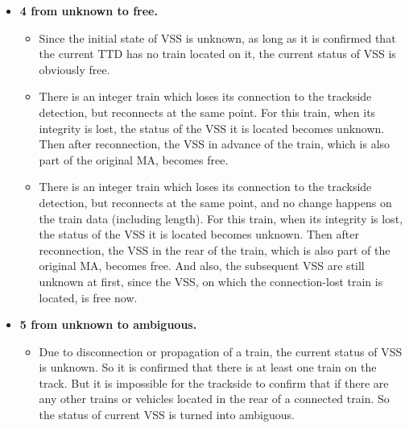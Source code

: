 \documentclass[article,dr=phil,type=drfinal,colorback,accentcolor=tud9c]{tudthesis}
\begin{document}
\begin{itemize}
\begin{itemize}
    \end{itemize}  		
  	
  	\item \textbf{4 from unknown to free.}
  	
  	\begin{itemize}
	
	\item 
	
	Since the initial state of VSS is unknown, as long as it is confirmed that the current TTD has no train located on it, the current status of VSS is obviously free.
	
	\item 
	
	There is an integer train which loses its connection to the trackside detection, but reconnects at the same point. For this train, when its integrity is lost, the status of the VSS it is located becomes unknown. Then after reconnection, the VSS in advance of the train, which is also part of the original MA, becomes free.
	
	\item 
	
	There is an integer train which loses its connection to the trackside detection, but reconnects at the same point, and no change happens on the train data (including length). For this train, when its integrity is lost, the status of the VSS it is located becomes unknown. Then after reconnection, the VSS in the rear of the train, which is also part of the original MA, becomes free. And also, the subsequent VSS are still unknown at first, since the VSS, on which the connection-lost train is located, is free now.
	
    \end{itemize}  	
  	
  	\item \textbf{5 from unknown to ambiguous.}

  	\begin{itemize}
	
	\item 
	
	Due to disconnection or propagation of a train, the current status of VSS is unknown. So it is confirmed that there is at least one train on the track. But it is impossible for the trackside to confirm that if there are any other trains or vehicles located in the rear of a connected train. So the status of current VSS is turned into ambiguous.
	
    \end{itemize} 
   	

\end{itemize}
\end{document}
